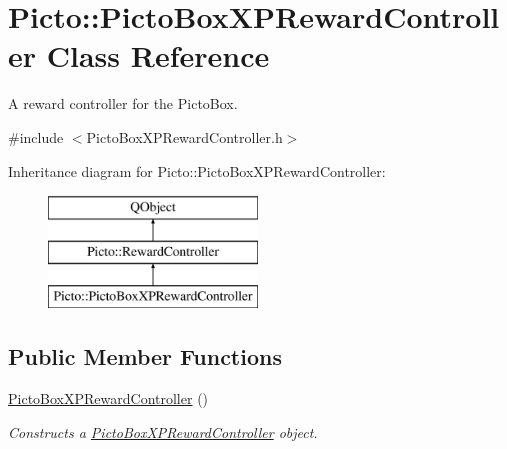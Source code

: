 \hypertarget{class_picto_1_1_picto_box_x_p_reward_controller}{\section{Picto\-:\-:Picto\-Box\-X\-P\-Reward\-Controller Class Reference}
\label{class_picto_1_1_picto_box_x_p_reward_controller}
}


A reward controller for the Picto\-Box.  




{\ttfamily \#include $<$Picto\-Box\-X\-P\-Reward\-Controller.\-h$>$}

Inheritance diagram for Picto\-:\-:Picto\-Box\-X\-P\-Reward\-Controller\-:\begin{figure}[H]
\begin{center}
\leavevmode
\includegraphics[height=3.000000cm]{class_picto_1_1_picto_box_x_p_reward_controller}
\end{center}
\end{figure}
\subsection*{Public Member Functions}
\begin{DoxyCompactItemize}
\item 
\hyperlink{class_picto_1_1_picto_box_x_p_reward_controller_ab2f7e7619d810f7e365beaedb1b01029}{Picto\-Box\-X\-P\-Reward\-Controller} ()
\begin{DoxyCompactList}\small\item\em Constructs a \hyperlink{class_picto_1_1_picto_box_x_p_reward_controller}{Picto\-Box\-X\-P\-Reward\-Controller} object. \end{DoxyCompactList}\end{DoxyCompactItemize}
